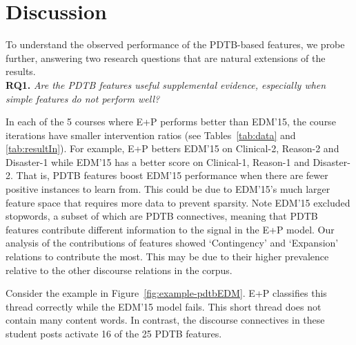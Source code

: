 \documentclass[letterpaper]{article}
\begin{document}
\section{Discussion}
\label{sect:discuss}

To understand the observed performance of the PDTB-based features, we
probe further, answering two research questions that are natural
extensions of the results.\\

\noindent \textbf{RQ1.} {\it Are the PDTB features useful supplemental evidence, 
especially when simple features do not perform well?}

In each of the 5 courses where E+P performs better than EDM'15, the course 
iterations have smaller intervention ratios (see Tables~\ref{tab:data} and 
\ref{tab:resultIn}). For example, E+P betters EDM'15 on {\sc Clinical-2}, {\sc 
Reason-2} and {\sc Disaster-1} while EDM'15 has a better score on {\sc Clinical-1}, 
{\sc Reason-1} and {\sc Disaster-2}.
That is, PDTB features boost EDM'15 performance when there 
are fewer positive instances to learn from. This could be due to EDM'15's 
much larger feature space that requires more data to prevent sparsity. Note 
EDM'15 excluded stopwords, a subset of which are PDTB connectives, meaning 
that PDTB features contribute different information to the signal in the E+P 
model.  Our analysis of the contributions of features showed `Contingency' and 
`Expansion' relations to contribute the most. This may be due to their higher 
prevalence relative to the other discourse relations in the corpus.

Consider the example in Figure~\ref{fig:example-pdtbEDM}. E+P classifies 
this thread correctly while the EDM'15 model fails. This short thread does not 
contain many content words. In contrast, the discourse connectives in these 
student posts activate 16 of the 25 PDTB features.
\end{document}
